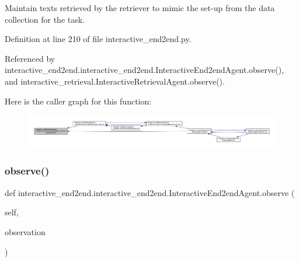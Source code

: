 \begin{DoxyVerb}Maintain texts retrieved by the retriever to mimic the set-up
from the data collection for the task.
\end{DoxyVerb}
 

Definition at line 210 of file interactive\+\_\+end2end.\+py.



Referenced by interactive\+\_\+end2end.\+interactive\+\_\+end2end.\+Interactive\+End2end\+Agent.\+observe(), and interactive\+\_\+retrieval.\+Interactive\+Retrieval\+Agent.\+observe().

Here is the caller graph for this function\+:
\nopagebreak
\begin{figure}[H]
\begin{center}
\leavevmode
\includegraphics[width=350pt]{classinteractive__end2end_1_1interactive__end2end_1_1InteractiveEnd2endAgent_a76bebd5d1faa6d6aa243984106ee96d8_icgraph}
\end{center}
\end{figure}
\mbox{\label{classinteractive__end2end_1_1interactive__end2end_1_1InteractiveEnd2endAgent_a582ae9a8c09b4e0287c79748054eb956}} 
\subsubsection{\texorpdfstring{observe()}{observe()}}
{\footnotesize\ttfamily def interactive\+\_\+end2end.\+interactive\+\_\+end2end.\+Interactive\+End2end\+Agent.\+observe (\begin{DoxyParamCaption}\item[{}]{self,  }\item[{}]{observation }\end{DoxyParamCaption})}




